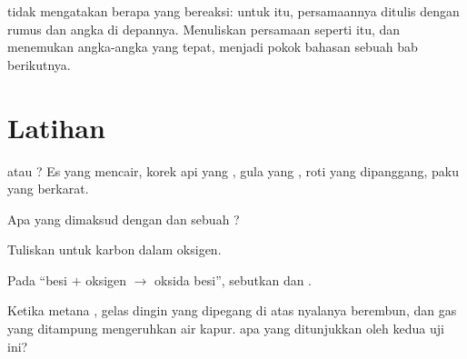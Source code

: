 \begin{remark}\label{rem:g7:chemical-reactions:counting}
 tidak mengatakan berapa  yang bereaksi: untuk itu,
persamaannya ditulis dengan rumus dan angka di depannya. Menuliskan
persamaan seperti itu, dan menemukan angka-angka yang tepat, menjadi
pokok bahasan sebuah bab berikutnya.
\end{remark}

\section{Latihan}

\begin{exercise}[$\star$]\label{exo:g7:chemical-reactions:1}
 atau ? Es yang mencair, korek api yang
, gula yang , roti yang dipanggang, paku yang berkarat.
\end{exercise}

\begin{exercise}[$\star$]\label{exo:g7:chemical-reactions:2}
Apa yang dimaksud dengan  dan  sebuah ?
\end{exercise}

\begin{exercise}[$\star$]\label{exo:g7:chemical-reactions:3}
Tuliskan  untuk  karbon dalam oksigen.
\end{exercise}

\begin{exercise}[$\star$]\label{exo:g7:chemical-reactions:4}
Pada  ``besi $+$ oksigen $\longrightarrow$ oksida besi'',
sebutkan  dan .
\end{exercise}

\begin{exercise}[$\star\star$]\label{exo:g7:chemical-reactions:5}
Ketika metana , gelas dingin yang dipegang di atas nyalanya
berembun, dan gas yang ditampung mengeruhkan air kapur.  apa yang
ditunjukkan oleh kedua uji ini?
\end{exercise}

